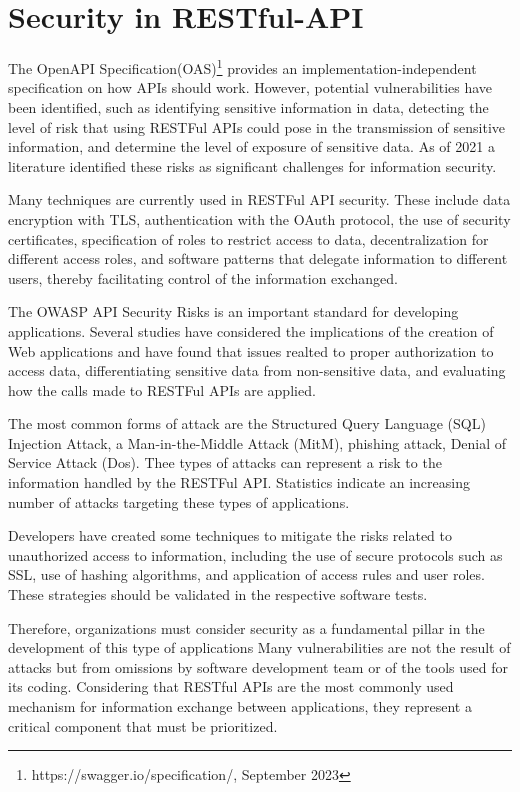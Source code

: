 \section{Security in RESTful-API}\label{sec:security}

 The OpenAPI Specification(OAS)\footnote{https://swagger.io/specification/, September 2023} provides an implementation-independent specification on how APIs should work. However, potential vulnerabilities have been identified, such as identifying sensitive information in data, detecting the level of risk that using RESTFul APIs could pose in the transmission of sensitive information, and determine the level of exposure of sensitive data. As of 2021 a literature identified these risks as significant challenges for information security\cite{Sun}.

Many techniques are currently used in RESTFul API security\cite{Siriwardena2020}. These include data encryption with TLS, authentication with the OAuth protocol, the use of security certificates, specification of roles to restrict access to data, decentralization for different access roles, and software patterns that delegate information to different users, thereby facilitating control of the information exchanged.

The OWASP API Security Risks is an important standard for developing applications. Several studies have considered the implications of the creation of Web applications\cite{Muhammad2021,Idris_Syarif_Winarno_2022,Cheh2021} and have found that issues realted to proper authorization to access data, differentiating sensitive data from non-sensitive data, and evaluating how the calls made to RESTFul APIs are applied.

The most common forms of attack\cite{Modi2022} are the Structured Query Language (SQL) Injection Attack, a Man-in-the-Middle Attack (MitM), phishing attack, Denial of Service Attack (Dos). Thee types of attacks can represent a risk to the information handled by the RESTFul API. Statistics indicate an increasing number of attacks targeting these types of applications.

Developers have created some techniques\cite{Munsch2021,zenodo2023} to mitigate the risks related to unauthorized access to information, including the use of secure protocols such as SSL, use of hashing algorithms, and application of access rules and user roles. These strategies should be validated in the respective software tests.

Therefore, organizations must consider security as a fundamental pillar in the development of this type of applications Many vulnerabilities are not the result of attacks but from omissions by software development team or of the tools used for its coding. Considering that RESTful APIs are the most commonly used mechanism for information exchange between applications, they represent a critical component that must be prioritized.

